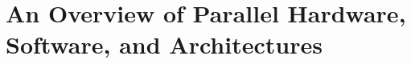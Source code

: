 \section{An Overview of Parallel Hardware, Software, and Architectures}
\makesubcontentsslides


%






